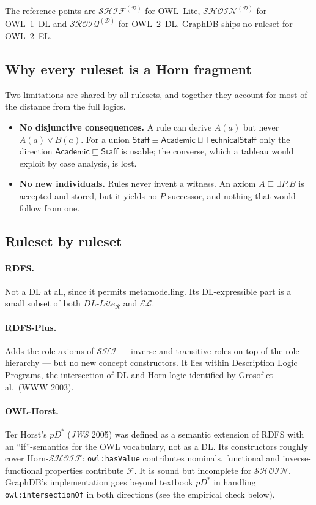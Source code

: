 \documentclass[11pt,a4paper]{article}
\newcommand{\dl}[1]{\ensuremath{\mathcal{#1}}}
\newcommand{\EL}{\dl{EL}}
\newcommand{\SROIQ}{\dl{SROIQ}}
\newcommand{\SHOIN}{\dl{SHOIN}}
\newcommand{\SHIF}{\dl{SHIF}}
\newcommand{\dllite}[1]{\ensuremath{\textit{DL-Lite}_{#1}}}
\newcommand{\cn}[1]{\mathsf{#1}}      %
\newcommand{\sub}{\sqsubseteq}
\newcommand{\eqv}{\equiv}
\begin{document}
\noindent
The reference points are $\SHIF^{(\mathcal{D})}$ for OWL~Lite,
$\SHOIN^{(\mathcal{D})}$ for OWL~1~DL and $\SROIQ^{(\mathcal{D})}$ for OWL~2~DL.
GraphDB ships no ruleset for OWL~2~EL.

\subsection*{Why every ruleset is a Horn fragment}

Two limitations are shared by all rulesets, and together they account for most
of the distance from the full logics.

\begin{itemize}
  \item \textbf{No disjunctive consequences.} A rule can derive $A(a)$ but never
    $A(a) \lor B(a)$. For a union
    $\cn{Staff} \eqv \cn{Academic} \sqcup \cn{TechnicalStaff}$ only the
    direction $\cn{Academic} \sub \cn{Staff}$ is usable; the converse, which a
    tableau would exploit by case analysis, is lost.
  \item \textbf{No new individuals.} Rules never invent a witness. An axiom
    $A \sub \exists P.B$ is accepted and stored, but it yields no
    $P$-successor, and nothing that would follow from one.
\end{itemize}

\subsection*{Ruleset by ruleset}

\paragraph{RDFS.} Not a DL at all, since it permits metamodelling. Its
DL-expressible part is a small subset of both $\dllite{\mathcal{R}}$ and \EL{}.

\paragraph{RDFS-Plus.} Adds the role axioms of \dl{SHI} --- inverse and
transitive roles on top of the role hierarchy --- but no new concept
constructors. It lies within Description Logic Programs, the intersection of
DL and Horn logic identified by Grosof et al.\ (WWW 2003).

\paragraph{OWL-Horst.} Ter Horst's $pD^*$ (\emph{JWS} 2005) was defined as a
semantic extension of RDFS with an ``if''-semantics for the OWL vocabulary, not
as a DL. Its constructors roughly cover Horn-\dl{SHOIF}: \texttt{owl:hasValue}
contributes nominals, functional and inverse-functional properties contribute
\dl{F}. It is sound but incomplete for \SHOIN{}. GraphDB's implementation goes
beyond textbook $pD^*$ in handling \texttt{owl:intersectionOf} in both
directions (see the empirical check below).
\end{document}

